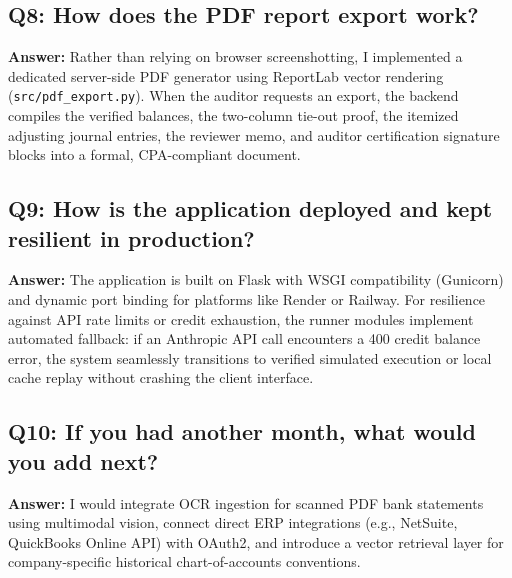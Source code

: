 \documentclass[10pt,a4paper]{article}
\begin{document}
\subsection{Q8: How does the PDF report export work?}
\textbf{Answer:} Rather than relying on browser screenshotting, I implemented a dedicated server-side PDF generator using ReportLab vector rendering (\texttt{src/pdf\_export.py}). When the auditor requests an export, the backend compiles the verified balances, the two-column tie-out proof, the itemized adjusting journal entries, the reviewer memo, and auditor certification signature blocks into a formal, CPA-compliant document.

\subsection{Q9: How is the application deployed and kept resilient in production?}
\textbf{Answer:} The application is built on Flask with WSGI compatibility (Gunicorn) and dynamic port binding for platforms like Render or Railway. For resilience against API rate limits or credit exhaustion, the runner modules implement automated fallback: if an Anthropic API call encounters a 400 credit balance error, the system seamlessly transitions to verified simulated execution or local cache replay without crashing the client interface.

\subsection{Q10: If you had another month, what would you add next?}
\textbf{Answer:} I would integrate OCR ingestion for scanned PDF bank statements using multimodal vision, connect direct ERP integrations (e.g., NetSuite, QuickBooks Online API) with OAuth2, and introduce a vector retrieval layer for company-specific historical chart-of-accounts conventions.
\end{document}
